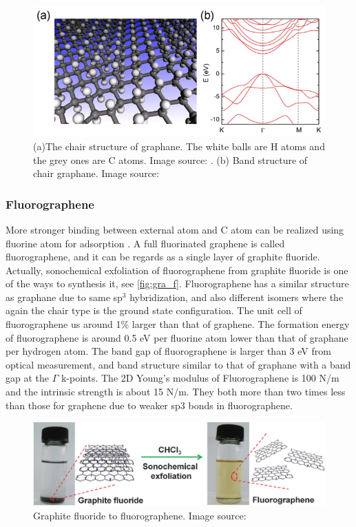 \begin{figure}[htbp!] 
\centering  
\includegraphics[width=1\textwidth]{graphane.eps}
\caption[Atomic and electronic structure of graphane]{(a)The chair structure of graphane. The white balls are H atoms and the grey ones are C atoms. Image source: \cite{Sofo2007}. (b) Band structure of chair graphane. Image source: \cite{leenaerts2010}}  
\label{fig:gra_h}
\end{figure} 

\subsubsection{Fluorographene}

More stronger binding between external atom and C atom can be realized using fluorine atom for adsorption . A full fluorinated graphene is called fluorographene, and it can be regards as a single layer of graphite fluoride. Actually, sonochemical exfoliation of fluorographene from graphite fluoride is one of the ways to synthesis it, see \autoref{fig:gra_f}\cite{Zhu2013}. Fluorographene has a similar structure as graphane due to same sp$^3$ hybridization, and also different isomers where the again the chair type is the ground state configuration\cite{samarakoon2011}. The unit cell of fluorographene us around 1\% larger than that of graphene\cite{nair2010}. The formation energy of fluorographene is around 0.5 eV per fluorine atom lower than that of graphane per hydrogen atom\cite{Jeon2011}. The band gap of fluorographene is larger than 3 eV from optical measurement\cite{nair2010,Jeon2011}, and band structure similar to that of graphane with a band gap at the $\Gamma$ k-points. The 2D Young's modulus of Fluorographene is 100 \si{N/m} and the intrinsic strength is about 15 \si{N/m}. They both more than two times less than those for graphene due to weaker sp$3$ bonds in fluorographene\cite{nair2010}.

\begin{figure}[htbp!] 
\centering  
\includegraphics[width=1\textwidth]{fluorographene.png}
\caption{Graphite fluoride to fluorographene. Image source:\cite{Zhu2013}}  
\label{fig:gra_f}
\end{figure} 

